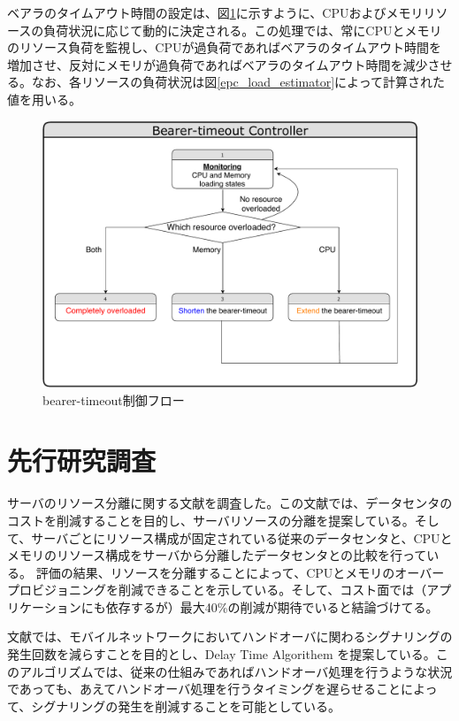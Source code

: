 \documentclass[a4j]{ujarticle}
\begin{document}
ベアラのタイムアウト時間の設定は、図\ref{bearer-timeout_controller}に示すように、CPUおよびメモリリソースの負荷状況に応じて動的に決定される。この処理では、常にCPUとメモリのリソース負荷を監視し、CPUが過負荷であればベアラのタイムアウト時間を増加させ、反対にメモリが過負荷であればベアラのタイムアウト時間を減少させる。なお、各リソースの負荷状況は図\ref{epc_load_estimator}によって計算された値を用いる。
\begin{figure}[htbp]
	\centering
	\includegraphics[width=0.7\hsize]{bearer-timeout_controller.pdf}
  \caption{bearer-timeout制御フロー}
	\label{bearer-timeout_controller}
\end{figure}

\clearpage
\section{先行研究調査}
サーバのリソース分離に関する文献\cite{TechnoEconomicFrameworkforCloudInfrastructureACostStudyofResourceDisaggregation}を調査した。この文献では、データセンタのコストを削減することを目的し、サーバリソースの分離を提案している。そして、サーバごとにリソース構成が固定されている従来のデータセンタと、CPUとメモリのリソース構成をサーバから分離したデータセンタとの比較を行っている。
評価の結果、リソースを分離することによって、CPUとメモリのオーバープロビジョニングを削減できることを示している。そして、コスト面では（アプリケーションにも依存するが）最大40\%の削減が期待でいると結論づけてる。

文献\cite{ModelingDelayTimerAlgorithmforHandoverReductioninHeterogeneousRadioAccessNetworks}では、モバイルネットワークにおいてハンドオーバに関わるシグナリングの発生回数を減らすことを目的とし、Delay Time Algorithem を提案している。このアルゴリズムでは、従来の仕組みであればハンドオーバ処理を行うような状況であっても、あえてハンドオーバ処理を行うタイミングを遅らせることによって、シグナリングの発生を削減することを可能としている。
\end{document}
